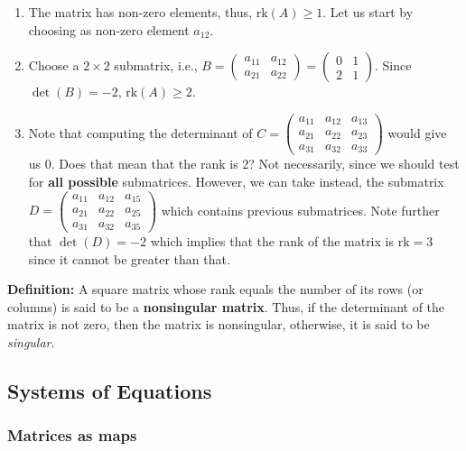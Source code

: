 \documentclass[11pt]{article}
\begin{document}
\begin{enumerate}
\def\labelenumi{\arabic{enumi}.}
\item
  The matrix has non-zero elements, thus, \(\text{rk}(A) \geq 1\). Let
  us start by choosing as non-zero element \(a_{12}\).
\item
  Choose a \(2\times 2\) submatrix, i.e.,
  \(B = \begin{pmatrix} a_{11} & a_{12} \\ a_{21} & a_{22} \end{pmatrix} = \begin{pmatrix} 0 & 1 \\ 2 & 1 \end{pmatrix}\).
  Since \(\det(B) = -2\), \(\text{rk}(A) \geq 2\).
\item
  Note that computing the determinant of
  \(C = \begin{pmatrix} a_{11} & a_{12} & a_{13}\\ a_{21} & a_{22} & a_{23} \\ a_{31} & a_{32} & a_{33}\end{pmatrix}\)
  would give us \(0\). Does that mean that the rank is \(2\)? Not
  necessarily, since we should test for \textbf{all possible}
  submatrices. However, we can take instead, the submatrix
  \(D = \begin{pmatrix} a_{11} & a_{12} & a_{15}\\ a_{21} & a_{22} & a_{25} \\ a_{31} & a_{32} & a_{35}\end{pmatrix}\)
  which contains previous submatrices. Note further that
  \(\det(D) = -2\) which implies that the rank of the matrix is
  \(\text{rk} = 3\) since it cannot be greater than that.
\end{enumerate}

\textbf{Definition:} A square matrix whose rank equals the number of its
rows (or columns) is said to be a \textbf{nonsingular matrix}. Thus, if
the determinant of the matrix is not zero, then the matrix is
nonsingular, otherwise, it is said to be \emph{singular}.

    \hypertarget{systems-of-equations}{%
\subsection{Systems of Equations}\label{systems-of-equations}}

\hypertarget{matrices-as-maps}{%
\subsubsection{Matrices as maps}\label{matrices-as-maps}}
\end{document}
